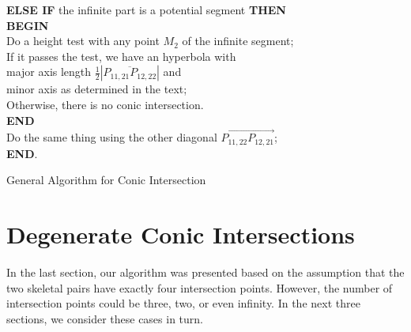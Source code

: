 \begin{table}
\begin{minipage}{5in}
{\begin{itemize}
\begin{tabbing}
          \>\>  {\bf ELSE IF} the infinite part is a potential segment {\bf THEN}\\
          \>\>\>    {\bf BEGIN} \\
          \>\>\>\>      Do a height test with any point $M_2$ of the infinite
                        segment; \\
          \>\>\>\>      If it passes the test, we have an hyperbola with \\
          \>\>\>\>\>         major axis length
                             $\frac{1}{2}|\overline{P_{11,21}P_{12,22}}|$ and\\
          \>\>\>\>\>         minor axis as determined in the text; \\
          \>\>\>\>      Otherwise, there is no conic intersection. \\
          \>\>\>    {\bf END} \\
          \>\> Do the same thing using the other diagonal
               $\stackrel{\longleftrightarrow}{P_{11,22}P_{12,21}}$; \\
          \> {\bf END}.
     \end{tabbing}
\end{itemize}
}
\end{minipage}
\vspace{3mm}
\caption{General Algorithm for Conic Intersection}
\end{table}


\section{Degenerate Conic Intersections}
\label{section:special-degenerate}
     In the last section, our algorithm was presented based on the assumption 
that the two skeletal pairs have exactly four intersection points.  However, 
the number of intersection points could be three, two, or even infinity.  In 
the next three sections, we consider these cases in turn.


